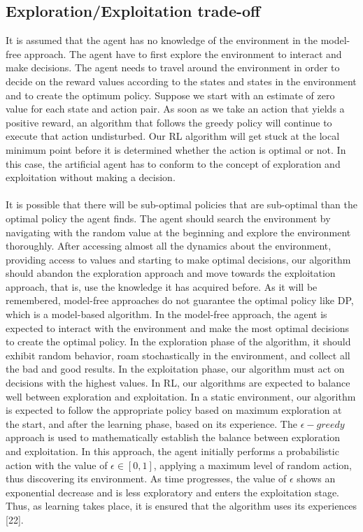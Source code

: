 \documentclass[12pt,twoside,a4]{mwbk}
\begin{document}
\subsection{Exploration/Exploitation trade-off}
It is assumed that the agent has no knowledge of the environment in the model-free approach. The agent have to first explore the environment to interact and make decisions. The agent needs to travel around the environment in order to decide on the reward values according to the states and states in the environment and to create the optimum policy. Suppose we start with an estimate of zero value for each state and action pair. As soon as we take an action that yields a positive reward, an algorithm that follows the greedy policy will continue to execute that action undisturbed. Our RL algorithm will get stuck at the local minimum point before it is determined whether the action is optimal or not. In this case, the artificial agent has to conform to the concept of exploration and exploitation without making a decision. \\ \\
It is possible that there will be sub-optimal policies that are sub-optimal than the optimal policy the agent finds. The agent should search the environment by navigating with the random value at the beginning and explore the environment thoroughly. After accessing almost all the dynamics about the environment, providing access to values and starting to make optimal decisions, our algorithm should abandon the exploration approach and move towards the exploitation approach, that is, use the knowledge it has acquired before. As it will be remembered, model-free approaches do not guarantee the optimal policy like DP, which is a model-based algorithm. In the model-free approach, the agent is expected to interact with the environment and make the most optimal decisions to create the optimal policy. In the exploration phase of the algorithm, it should exhibit random behavior, roam stochastically in the environment, and collect all the bad and good results. In the exploitation phase, our algorithm must act on decisions with the highest values. In RL, our algorithms are expected to balance well between exploration and exploitation. In a static environment, our algorithm is expected to follow the appropriate policy based on maximum exploration at the start, and after the learning phase, based on its experience. The $\epsilon - greedy$ approach is used to mathematically establish the balance between exploration and exploitation. In this approach, the agent initially performs a probabilistic action with the value of $\epsilon \in [0,1]$, applying a maximum level of random action, thus discovering its environment. As time progresses, the value of $\epsilon$ shows an exponential decrease and is less exploratory and enters the exploitation stage. Thus, as learning takes place, it is ensured that the algorithm uses its experiences [22].
\end{document}
